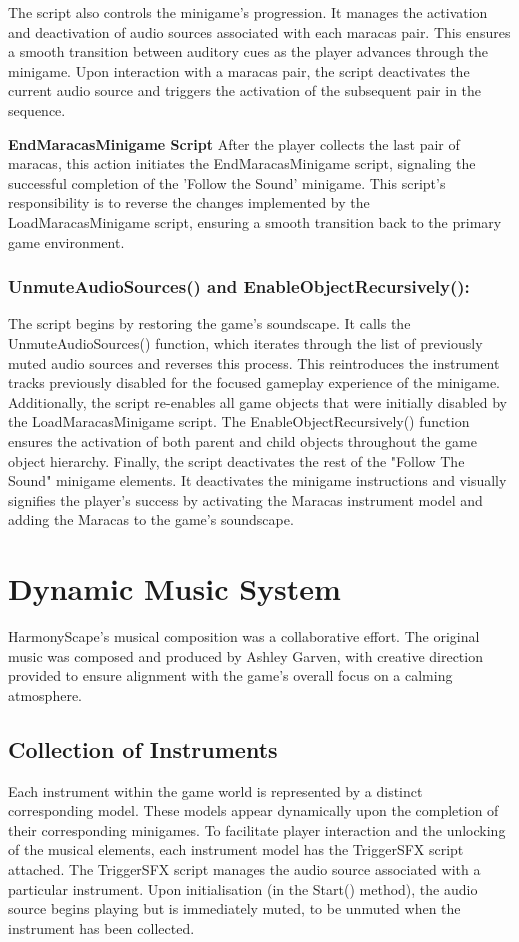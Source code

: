 \documentclass{l4proj}
\begin{document}
The script also controls the minigame's progression. It manages the activation and deactivation of audio sources associated with each maracas pair. This ensures a smooth transition between auditory cues as the player advances through the minigame. Upon interaction with a maracas pair, the script deactivates the current audio source and triggers the activation of the subsequent pair in the sequence.
\newline


\textbf{EndMaracasMinigame Script} \newline
After the player collects the last pair of maracas, this action initiates the EndMaracasMinigame script, signaling the successful completion of the 'Follow the Sound' minigame. This script's responsibility is to reverse the changes implemented by the LoadMaracasMinigame script, ensuring a smooth transition back to the primary game environment.

\subsubsection{UnmuteAudioSources() and EnableObjectRecursively():} The script begins by restoring the game's soundscape. It calls the UnmuteAudioSources() function, which iterates through the list of previously muted audio sources and reverses this process. This reintroduces the instrument tracks previously disabled for the focused gameplay experience of the minigame. Additionally, the script re-enables all game objects that were initially disabled by the LoadMaracasMinigame script. The EnableObjectRecursively() function ensures the activation of both parent and child objects throughout the game object hierarchy. Finally, the script deactivates the rest of the "Follow The Sound" minigame elements. It deactivates the minigame instructions and visually signifies the player's success by activating the Maracas instrument model and adding the Maracas to the game's soundscape.

\section{Dynamic Music System}
HarmonyScape's musical composition was a collaborative effort. The original music was composed and produced by Ashley Garven, with creative direction provided to ensure alignment with the game's overall focus on a calming atmosphere.

\subsection{Collection of Instruments}
Each instrument within the game world is represented by a distinct corresponding model. These models appear dynamically upon the completion of their corresponding minigames. To facilitate player interaction and the unlocking of the musical elements, each instrument model has the TriggerSFX script attached. The TriggerSFX script manages the audio source associated with a particular instrument. Upon initialisation (in the Start() method), the audio source begins playing but is immediately muted, to be unmuted when the instrument has been collected.
\end{document}
